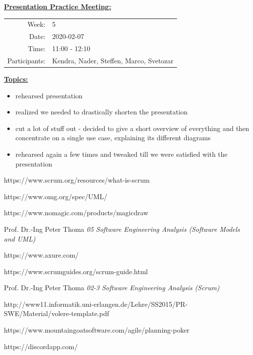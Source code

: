 \documentclass[a4paper, 12pt]{article}
\newcommand{\protocolheader}[5]{
    \vspace{1em}
    \underline{\textbf{#1:}}
    
    \begin{tabular}{rl}
        Week:   & #2\\
        Date:   & #3\\
        Time:   & #4\\
        Participants:   & #5\\
    \end{tabular}
    
    \vspace{1em}
    \underline{\textbf{Topics:}}
}
\begin{document}
\protocolheader{Presentation Practice Meeting}{5}{2020-02-07}{11:00 - 12:10}
    {Kendra, Nader, Steffen, Marco, Svetozar}
\begin{itemize}
    \item rehearsed presentation
    \item realized we needed to drastically shorten the presentation
    \item cut a lot of stuff out - decided to give a short overview of everything and then concentrate on a single use case, explaining its different diagrams
    \item rehearsed again a few times and tweaked till we were satisfied with the presentation
\end{itemize}


\newpage
\listoffigures

\newpage
\begin{thebibliography}{}

https://www.scrum.org/resources/what-is-scrum

https://www.omg.org/spec/UML/

https://www.nomagic.com/products/magicdraw

Prof. Dr.-Ing Peter Thoma \emph{05 Software Engineering Analysis (Software Models and UML)}

https://www.axure.com/

https://www.scrumguides.org/scrum-guide.html

Prof. Dr.-Ing Peter Thoma \emph{02-3 Software Engineering Analysis (Scrum)}

http://www11.informatik.uni-erlangen.de/Lehre/SS2015/PR-SWE/Material/volere-template.pdf

https://www.mountaingoatsoftware.com/agile/planning-poker

https://discordapp.com/

\end{thebibliography}
\end{document}
